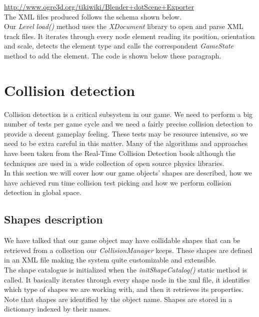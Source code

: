 \url{http://www.ogre3d.org/tikiwiki/Blender+dotScene+Exporter}\\

The XML files produced follows the schema shown below.\\



Our \textit{Level} \textit{load()} method uses the \textit{XDocument} library to
open and parse XML track files. It iterates through every node element
reading its position, orientation and scale, detects the element type
and calls the correspondent \textit{GameState} method to add the element. The
code is shown below these paragraph.\\



\section{Collision detection}
\label{sec:collision-detection}

Collision detection is a critical subsystem in our game. We need to perform a big number
of tests per game cycle and we need a fairly precise collision detection to provide
a decent gameplay feeling. These tests may be resource intensive, so we need to be extra
careful in this matter. Many of the algorithms and approaches have been taken from the
Real-Time Collision Detection book \cite{eric05} although the techniques are used
in a wide collection of open source physics libraries.\\

In this section we will cover how our game objects' shapes are described, how we
have achieved run time collision test picking and how we perform collision detection in
global space.

\subsection{Shapes description}

We have talked that our game object may have collidable shapes that can be retrieved from
a collection our \textit{CollisionManager} keeps. These shapes are defined in an XML
file making the system quite customizable and extensible.\\



The shape catalogue is initialized when the \textit{initShapeCatalog()} static method is
called. It basically iterates through every shape node in the xml file, it identifies
which type of shapes we are working with, and then it retrieves its properties. Note
that shapes are identified by the object name. Shapes are stored in a dictionary
indexed by their names.\\

